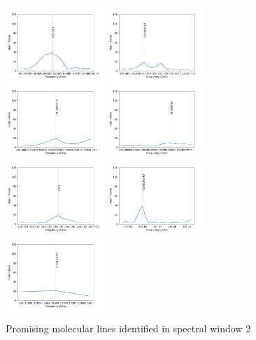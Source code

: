 \documentclass{aa}
\begin{document}
\begin{figure}
\includegraphics[width=0.33\textwidth]{spw2_H2C18O}
\includegraphics[width=0.33\textwidth]{spw2_t-H13COOH}
\includegraphics[width=0.33\textwidth]{spw2_CH3OHvt=0}
\includegraphics[width=0.33\textwidth]{spw2_CH3OCHO}
\includegraphics[width=0.33\textwidth]{spw2_CCO}
\includegraphics[width=0.33\textwidth]{spw2_t-CH2CHCHO}
\includegraphics[width=0.33\textwidth]{spw2_s-H2CCHOH}

    \caption{Promising molecular lines identified in spectral window 2}
   \end{figure}
   
\end{document}
